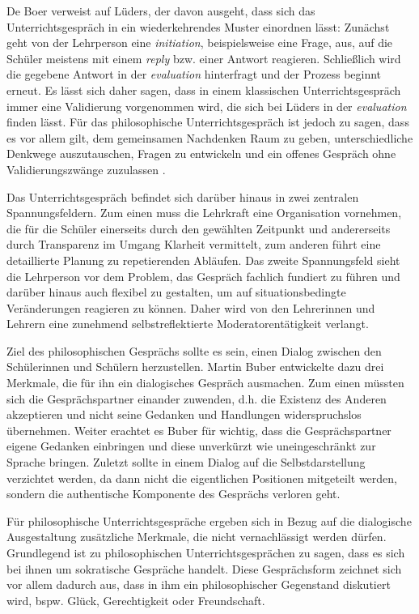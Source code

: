 De Boer verweist auf Lüders, der davon ausgeht, dass sich das Unterrichtsgespräch in ein wiederkehrendes Muster einordnen lässt\cite[S.\,28]{HB15}:
 Zunächst geht von der Lehrperson eine \textit{initiation}, beispielsweise eine Frage, aus, auf die Schüler meistens mit einem \textit{reply} bzw. einer Antwort reagieren. 
 Schließlich wird die gegebene Antwort in der \textit{evaluation} hinterfragt und der Prozess beginnt erneut. 
 Es lässt sich daher sagen, dass in einem klassischen Unterrichtsgespräch immer eine Validierung vorgenommen wird, die sich bei Lüders in der \textit{evaluation} finden lässt. 
 Für das philosophische Unterrichtsgespräch ist jedoch zu sagen, dass es vor allem gilt, \glqq dem gemeinsamen Nachdenken Raum zu geben, unterschiedliche Denkwege auszutauschen, Fragen zu entwickeln und ein offenes Gespräch ohne Validierungszwänge zuzulassen\grqq{} \cite[S.\,159]{HD15}.
 
Das Unterrichtsgespräch befindet sich darüber hinaus in zwei zentralen Spannungsfeldern. 
Zum einen muss die Lehrkraft eine Organisation vornehmen, die für die Schüler einerseits durch den gewählten Zeitpunkt und andererseits durch Transparenz im Umgang Klarheit vermittelt, zum anderen führt eine detaillierte Planung zu repetierenden Abläufen\cite[S.\,31]{HB15}. 
Das zweite Spannungsfeld sieht die Lehrperson vor dem Problem, das Gespräch fachlich fundiert zu führen und darüber hinaus auch flexibel zu gestalten, um auf situationsbedingte Veränderungen reagieren zu können. 
Daher wird von den Lehrerinnen und Lehrern eine zunehmend selbstreflektierte Moderatorentätigkeit verlangt.

Ziel des philosophischen Gesprächs sollte es sein, einen Dialog zwischen den Schülerinnen und Schülern herzustellen. 
Martin Buber entwickelte dazu drei Merkmale, die für ihn ein dialogisches Gespräch ausmachen. 
Zum einen müssten sich die Gesprächspartner einander zuwenden, d.h. die Existenz des Anderen akzeptieren und nicht seine Gedanken und Handlungen widerspruchslos  übernehmen\cite[S.\,106]{MB15}.
Weiter erachtet es Buber für wichtig, dass die Gesprächspartner eigene Gedanken einbringen und diese unverkürzt wie uneingeschränkt zur Sprache bringen. 
Zuletzt sollte in einem Dialog auf die Selbstdarstellung verzichtet werden, da dann nicht die eigentlichen Positionen mitgeteilt werden, sondern die authentische Komponente des Gesprächs verloren geht.

Für philosophische Unterrichtsgespräche ergeben sich in Bezug auf die dialogische Ausgestaltung zusätzliche Merkmale, die nicht vernachlässigt werden dürfen. 
Grundlegend ist zu philosophischen Unterrichtsgesprächen zu sagen, dass es sich bei ihnen um sokratische Gespräche handelt. 
Diese Gesprächsform zeichnet sich vor allem dadurch aus, \glqq dass in ihm ein philosophischer Gegenstand diskutiert wird, bspw. Glück, Gerechtigkeit oder Freundschaft.\grqq{} \cite[S.\,27]{BB10}

